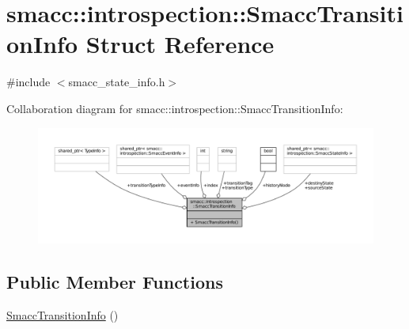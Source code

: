 \hypertarget{structsmacc_1_1introspection_1_1SmaccTransitionInfo}{}\section{smacc\+:\+:introspection\+:\+:Smacc\+Transition\+Info Struct Reference}
\label{structsmacc_1_1introspection_1_1SmaccTransitionInfo}


{\ttfamily \#include $<$smacc\+\_\+state\+\_\+info.\+h$>$}



Collaboration diagram for smacc\+:\+:introspection\+:\+:Smacc\+Transition\+Info\+:
\nopagebreak
\begin{figure}[H]
\begin{center}
\leavevmode
\includegraphics[width=350pt]{structsmacc_1_1introspection_1_1SmaccTransitionInfo__coll__graph}
\end{center}
\end{figure}
\subsection*{Public Member Functions}
\begin{DoxyCompactItemize}
\item 
\hyperlink{structsmacc_1_1introspection_1_1SmaccTransitionInfo_ad9f52aaeeecec400ac9419cc69054204}{Smacc\+Transition\+Info} ()
\end{DoxyCompactItemize}
